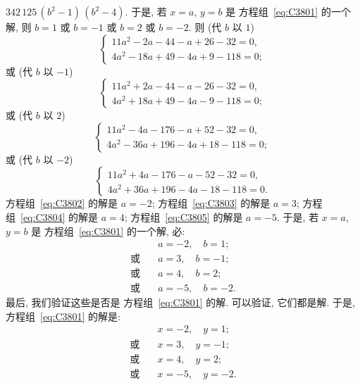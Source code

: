 \begin{example}
    \(342\,125\, (b^2 - 1)\, (b^2 - 4)\).
    于是, 若 \(x = a\), \(y = b\) 是%
    方程组~\eqref{eq:C3801} 的一个解,
    则 \(b = 1\) 或 \(b = -1\)
    或 \(b = 2\) 或 \(b = -2\).
    则 (代 \(b\) 以 \(1\))
    \begin{equation}
        \begin{cases}
            11a^2 - 2a - 44 - a + 26 - 32 = 0, \\
            4a^2 - 18a + 49 - 4a + 9 - 118 = 0;
        \end{cases}
        \label{eq:C3802}
    \end{equation}
    或 (代 \(b\) 以 \(-1\))
    \begin{equation}
        \begin{cases}
            11a^2 + 2a - 44 - a - 26 - 32 = 0, \\
            4a^2 + 18a + 49 - 4a - 9 - 118 = 0;
        \end{cases}
        \label{eq:C3803}
    \end{equation}
    或 (代 \(b\) 以 \(2\))
    \begin{equation}
        \begin{cases}
            11a^2 - 4a - 176 - a + 52 - 32 = 0, \\
            4a^2 - 36a + 196 - 4a + 18 - 118 = 0;
        \end{cases}
        \label{eq:C3804}
    \end{equation}
    或 (代 \(b\) 以 \(-2\))
    \begin{equation}
        \begin{cases}
            11a^2 + 4a - 176 - a - 52 - 32 = 0, \\
            4a^2 + 36a + 196 - 4a - 18 - 118 = 0.
        \end{cases}
        \label{eq:C3805}
    \end{equation}
    方程组~\eqref{eq:C3802} 的解是 \(a = -2\);
    方程组~\eqref{eq:C3803} 的解是 \(a = 3\);
    方程组~\eqref{eq:C3804} 的解是 \(a = 4\);
    方程组~\eqref{eq:C3805} 的解是 \(a = -5\).
    于是, 若 \(x = a\), \(y = b\) 是%
    方程组~\eqref{eq:C3801} 的一个解,
    必:
    \begin{align*}
         & a = -2, \quad b = 1;  \\
        \text{或} \quad
         & a = 3, \quad b = -1;  \\
        \text{或} \quad
         & a = 4, \quad b = 2;   \\
        \text{或} \quad
         & a = -5, \quad b = -2.
    \end{align*}
    最后, 我们验证这些是否是%
    方程组~\eqref{eq:C3801} 的解.
    可以验证, 它们都是解.
    于是,
    方程组~\eqref{eq:C3801} 的解是:
    \begin{align*}
         & x = -2, \quad y = 1;  \\
        \text{或} \quad
         & x = 3, \quad y = -1;  \\
        \text{或} \quad
         & x = 4, \quad y = 2;   \\
        \text{或} \quad
         & x = -5, \quad y = -2.
    \end{align*}
\end{example}
